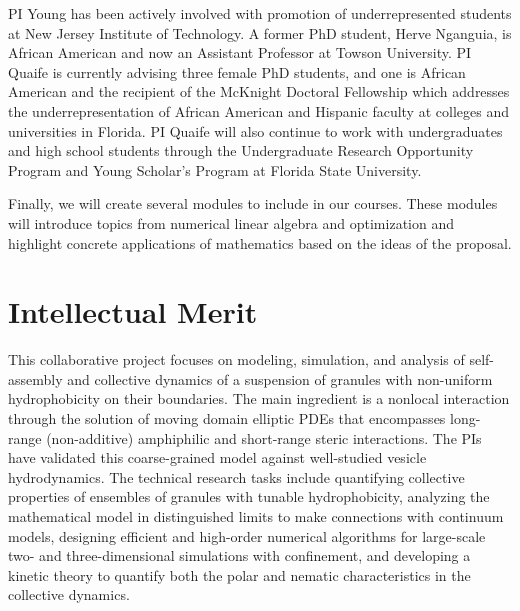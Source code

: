PI Young has been actively involved with promotion of underrepresented
students at New Jersey Institute of Technology. A former PhD student,
Herve Nganguia, is African American and now an Assistant Professor at
Towson University. PI Quaife is currently advising three female PhD
students, and one is African American and the recipient of the McKnight
Doctoral Fellowship which addresses the underrepresentation of African
American and Hispanic faculty at colleges and universities in Florida.
PI Quaife will also continue to work with undergraduates and high school
students through the Undergraduate Research Opportunity Program and
Young Scholar's Program at Florida State University.

Finally, we will create several modules to include in our courses. These
modules will introduce topics from numerical linear algebra and
optimization and highlight concrete applications of mathematics based on
the ideas of the proposal.

\section{Intellectual Merit}
\label{sec:IntellectualMerit}
This collaborative project focuses on modeling, simulation, and analysis
of self-assembly and collective dynamics of a suspension of granules
with non-uniform hydrophobicity on their boundaries. The main ingredient
is a nonlocal interaction through the solution of moving domain elliptic
PDEs that encompasses long-range (non-additive) amphiphilic and
short-range steric interactions. The PIs have validated this
coarse-grained model against well-studied vesicle hydrodynamics. The
technical research tasks include quantifying collective properties of
ensembles of granules with tunable hydrophobicity, analyzing the
mathematical model in distinguished limits to make connections with
continuum models, designing efficient and high-order numerical
algorithms for large-scale two- and three-dimensional simulations with
confinement, and developing a kinetic theory to quantify both the polar
and nematic characteristics in the collective dynamics.


